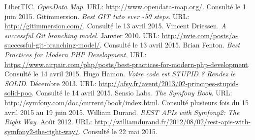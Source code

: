 \begin{thebibliography}{ABC}
     LiberTIC. \emph{OpenData Map}. URL: \url{http://www.opendata-map.org/}. Consulté le 1 juin 2015.
     Gitimmersion. \emph{Best GIT tuto ever -50 steps}. URL: \url{http://gitimmersion.com/}. Consulté le 13 avril 2015.
     Vincent Driessen. \emph{A successful Git branching model}. Janvier 2010. URL: \url{http://nvie.com/posts/a-successful-git-branching-model/}. Consulté le 13 avril 2015.
     Brian Fenton. \emph{Best Practices for Modern PHP Development}. URL: \url{https://www.airpair.com/php/posts/best-practices-for-modern-php-development}. Consulté le 14 avril 2015.
     Hugo Hamon. \emph{Votre code est STUPID ? Rendez le SOLID}. Décembre 2013. URL: \url{http://afsy.fr/avent/2013/02-principes-stupid-solid-poo}. Consulté le 14 avril 2015.
     Sensio Labs. \emph{The Symfony Book}. URL: \url{http://symfony.com/doc/current/book/index.html}. Consulté plusieurs fois du 15 avril 2015 au 19 juin 2015.
     William Durand. \emph{REST APIs with Symfony2: The Right Way}. Août 2012. URL: \url{http://williamdurand.fr/2012/08/02/rest-apis-with-symfony2-the-right-way/}. Consulté le 22 mai 2015.
\end{thebibliography}
